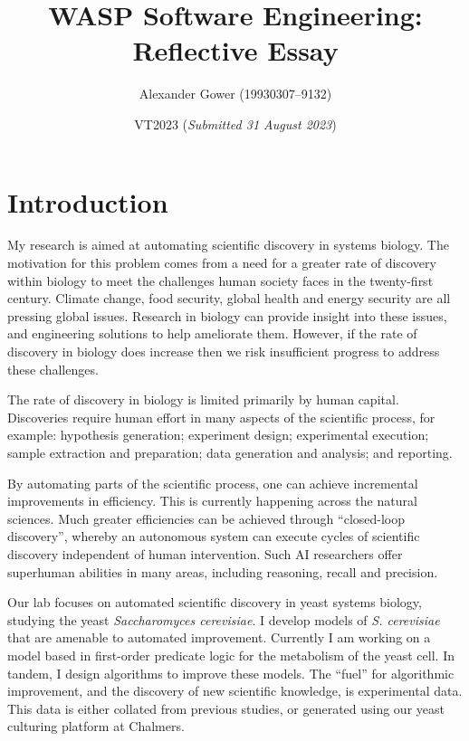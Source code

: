 \documentclass[11pt]{article}
\title{WASP Software Engineering: Reflective Essay}
\author{Alexander Gower (19930307--9132)}
\date{VT2023 (\emph{Submitted 31 August 2023})}
\newcommand{\textwidthrule}[1]{\noindent\makebox[\linewidth]{\rule{\textwidth}{#1}}}
\begin{document}
\maketitle
\textwidthrule{0.4pt}
\tableofcontents
\vspace*{1em}
\textwidthrule{0.4pt}

\section{Introduction}

My research is aimed at automating scientific discovery in systems biology.
The motivation for this problem comes from a need for a greater rate of discovery within biology to meet the challenges human society faces in the twenty-first century.
Climate change, food security, global health and energy security are all pressing global issues.
Research in biology can provide insight into these issues, and engineering solutions to help ameliorate them.
However, if the rate of discovery in biology does increase
then we risk insufficient progress to address these challenges.

The rate of discovery in biology is limited primarily by human capital.
Discoveries require human effort in many aspects of the scientific process,
for example:
hypothesis generation;
experiment design;
experimental execution;
sample extraction and preparation;
data generation and analysis;
and reporting.

By automating parts of the scientific process, one can achieve incremental improvements in efficiency. This is currently happening across the natural sciences.
Much greater efficiencies can be achieved through ``closed-loop discovery'', whereby an autonomous system can execute cycles of scientific discovery independent of human intervention.
Such AI researchers offer superhuman abilities in many areas, including reasoning, recall and precision.

Our lab focuses on automated scientific discovery in yeast systems biology, studying the yeast \textit{Saccharomyces cerevisiae}.
I develop models of \textit{S. cerevisiae} that are amenable to automated improvement.
Currently I am working on a model based in first-order predicate logic for the metabolism of the yeast cell.
In tandem, I design algorithms to improve these models.
The ``fuel'' for algorithmic improvement, and the discovery of new scientific knowledge, is experimental data.
This data is either collated from previous studies, or generated using our yeast culturing platform at Chalmers.
\end{document}
